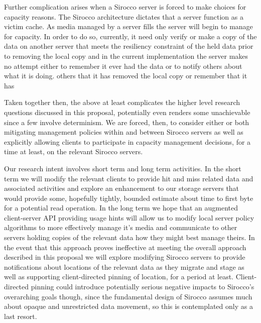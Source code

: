 Further complication arises when a Sirocco server is forced to make choices for
capacity reasons. The Sirocco architecture dictates that a server function as a
victim cache. As media managed by a server fills the server will begin to
manage for capacity. In order to do so, currently, it need only verify or make
a copy of the data on another server that meets the resiliency constraint of
the held data prior to removing the local copy and in the current
implementation the server makes no attempt either to remember it ever had the
data or to notify others about what it is doing.  others that it has removed
the local copy or remember that it has 

Taken together then, the above at least complicates the higher level research
questions discussed in this proposal, potentially even renders some
unachievable since a few involve determinism. We are forced, then, to consider
either or both mitigating management policies within and between Sirocco
servers as well as explicitly allowing clients to participate in capacity
management decisions, for a time at least, on the relevant Sirocco servers.

Our research intent involves short term and long term activities. In the short
term we will modify the relevant clients to provide hit and miss related data
and associated activities and explore an enhancement to our storage servers
that would provide some, hopefully tightly, bounded estimate about time to
first byte for a potential read operation. In the long term we hope that an
augmented client-server API providing usage hints will allow us to modify local
server policy algorithms to more effectively manage it's media and communicate
to other servers holding copies of the relevant data how they might best manage
theirs. In the event that this approach proves ineffective at meeting the
overall approach described in this proposal we will explore modifying Sirocco
servers to provide notifications about locations of the relevant data as they
migrate and stage as well as supporting client-directed pinning of location,
for a period at least. Client-directed pinning could introduce potentially
serious negative impacts to Sirocco's overarching goals though, since the
fundamental design of Sirocco assumes much about opaque and unrestricted data
movement, so this is contemplated only as a last resort.

